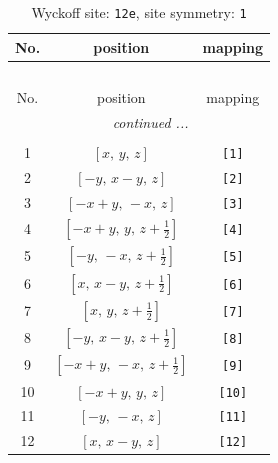 \documentclass[fleqn,8pt]{jsarticle}
\begin{document}
\renewcommand{\arraystretch}{1.2}
\begin{longtable}{ccc}
\caption{Wyckoff site: {\tt 12e}, site symmetry: {\tt 1}}
 \\
 \hline \hline
No. & position & mapping \\ \hline \endfirsthead

\multicolumn{2}{l}{\tablename\ \thetable{}} \\
 \hline \hline
No. & position & mapping \\ \hline \endhead

 \hline \hline
\multicolumn{2}{r}{\footnotesize\it continued ...} \\ \endfoot

 \hline \hline
\multicolumn{2}{r}{} \\ \endlastfoot

1 & $\left[ x,\, y,\, z \right]$ & {\tt [1]} \\ \hline
2 & $\left[ - y,\, x - y,\, z \right]$ & {\tt [2]} \\ \hline
3 & $\left[ - x + y,\, - x,\, z \right]$ & {\tt [3]} \\ \hline
4 & $\left[ - x + y,\, y,\, z + \frac{1}{2} \right]$ & {\tt [4]} \\ \hline
5 & $\left[ - y,\, - x,\, z + \frac{1}{2} \right]$ & {\tt [5]} \\ \hline
6 & $\left[ x,\, x - y,\, z + \frac{1}{2} \right]$ & {\tt [6]} \\ \hline
7 & $\left[ x,\, y,\, z + \frac{1}{2} \right]$ & {\tt [7]} \\ \hline
8 & $\left[ - y,\, x - y,\, z + \frac{1}{2} \right]$ & {\tt [8]} \\ \hline
9 & $\left[ - x + y,\, - x,\, z + \frac{1}{2} \right]$ & {\tt [9]} \\ \hline
10 & $\left[ - x + y,\, y,\, z \right]$ & {\tt [10]} \\ \hline
11 & $\left[ - y,\, - x,\, z \right]$ & {\tt [11]} \\ \hline
12 & $\left[ x,\, x - y,\, z \right]$ & {\tt [12]} \\
\end{longtable}
\end{document}
